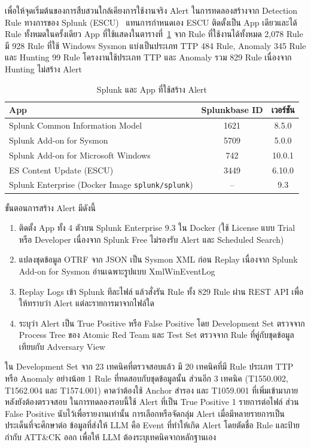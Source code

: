 เพื่อให้จุดเริ่มต้นของการสืบสวนใกล้เคียงการใช้งานจริง Alert ในการทดลองสร้างจาก Detection Rule ทางการของ Splunk (ESCU)~\cite{splunk-escu}
แทนการกำหนดเอง ESCU ติดตั้งเป็น App เดียวและได้ Rule ทั้งหมดในครั้งเดียว
App ที่ใช้แสดงในตารางที่~\ref{tab:splunk-apps}
จาก Rule ที่ใช้งานได้ทั้งหมด 2,078 Rule มี 928 Rule ที่ใช้ Windows Sysmon
แบ่งเป็นประเภท TTP 484 Rule, Anomaly 345 Rule และ Hunting 99 Rule
โครงงานใช้ประเภท TTP และ Anomaly รวม 829 Rule เนื่องจาก Hunting ไม่สร้าง Alert

\begin{table}[ht]
  \centering
  \caption{Splunk และ App ที่ใช้สร้าง Alert}
  \label{tab:splunk-apps}
  \small
  \begin{tabular}{|l|c|c|}
    \hline
    \textbf{App} & \textbf{Splunkbase ID} & \textbf{เวอร์ชัน} \\ \hline
    Splunk Common Information Model & 1621 & 8.5.0 \\ \hline
    Splunk Add-on for Sysmon & 5709 & 5.0.0 \\ \hline
    Splunk Add-on for Microsoft Windows & 742 & 10.0.1 \\ \hline
    ES Content Update (ESCU) & 3449 & 6.10.0 \\ \hline
    Splunk Enterprise (Docker Image \texttt{splunk/splunk}) & -- & 9.3 \\ \hline
  \end{tabular}
\end{table}

ขั้นตอนการสร้าง Alert มีดังนี้
\begin{enumerate}
  \item ติดตั้ง App ทั้ง 4 ตัวบน Splunk Enterprise 9.3 ใน Docker (ใช้ License แบบ Trial หรือ Developer
        เนื่องจาก Splunk Free ไม่รองรับ Alert และ Scheduled Search)
  \item แปลงชุดข้อมูล OTRF จาก JSON เป็น Sysmon XML ก่อน Replay
        เนื่องจาก Splunk Add-on for Sysmon อ่านเฉพาะรูปแบบ XmlWinEventLog
  \item Replay Logs เข้า Splunk ทีละไฟล์ แล้วสั่งรัน Rule ทั้ง 829 Rule ผ่าน REST API
        เพื่อให้ทราบว่า Alert แต่ละรายการมาจากไฟล์ใด
  \item ระบุว่า Alert เป็น True Positive หรือ False Positive
        โดย Development Set ตรวจจาก Process Tree ของ Atomic Red Team
        และ Test Set ตรวจจาก Rule ที่คู่กับชุดข้อมูลเทียบกับ Adversary View
\end{enumerate}

ใน Development Set จาก 23 เทคนิคที่ตรวจสอบแล้ว มี 20 เทคนิคที่มี Rule ประเภท TTP หรือ Anomaly อย่างน้อย 1 Rule
ที่ทดสอบกับชุดข้อมูลนั้น ส่วนอีก 3 เทคนิค (T1550.002, T1562.004 และ T1574.001) คาดว่าต้องใช้ Anchor สำรอง
และ T1059.001 ที่เพิ่มเข้ามาภายหลังยังต้องตรวจสอบ
ในการทดลองรอบนี้ใช้ Alert ที่เป็น True Positive 1 รายการต่อไฟล์ ส่วน False Positive นับไว้เพื่อรายงานเท่านั้น
การเลือกหรือจัดกลุ่ม Alert เมื่อมีหลายรายการเป็นประเด็นที่จะศึกษาต่อ
ข้อมูลที่ส่งให้ LLM คือ Event ที่ทำให้เกิด Alert โดยตัดชื่อ Rule และป้ายกำกับ ATT\&CK ออก
เพื่อให้ LLM ต้องระบุเทคนิคจากหลักฐานเอง

